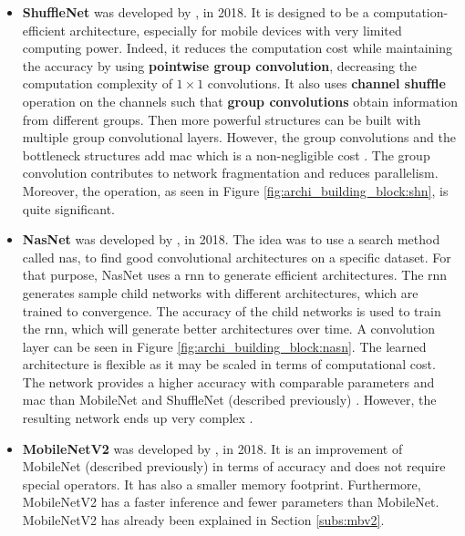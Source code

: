 \begin{itemize}
    \item \textbf{ShuffleNet}  was developed by \textcite{zhang_shufflenet_2018}, in 2018. It is designed to be a computation-efficient architecture, especially for mobile devices with very limited computing power. Indeed, it reduces the computation cost while maintaining the accuracy by using \textbf{pointwise group convolution}, decreasing the computation complexity of $1 \times 1$ convolutions. It also uses \textbf{channel shufﬂe} operation on the channels such that \textbf{group convolutions} obtain information from different groups. Then more powerful structures can be built with multiple group convolutional layers. However, the group convolutions and the bottleneck structures add \acrfull{mac} which is a non-negligible cost \cite{ma_shufflenet_2018}. The group convolution contributes to network fragmentation and reduces parallelism. Moreover, the  operation, as seen in Figure \ref{fig:archi_building_block:shn}, is quite significant.
    \item \textbf{NasNet} was developed by \textcite{zoph_learning_2018}, in 2018. The idea was to use a search method called \acrfull{nas}, to find good convolutional architectures on a specific dataset. For that purpose, NasNet uses a \acrfull{rnn} to generate efficient architectures. The \acrshort{rnn} generates sample child networks with different architectures, which are trained to convergence. The accuracy of the child networks is used to train the \acrshort{rnn}, which will generate better architectures over time. A convolution layer can be seen in Figure \ref{fig:archi_building_block:nasn}. The learned architecture is flexible as it may be scaled in terms of computational cost. The network provides a higher accuracy with comparable parameters and \acrshort{mac} than MobileNet and ShuffleNet (described previously) \cite{zoph_learning_2018}. However, the resulting network ends up very complex \cite{sandler_mobilenetv2_2018}.
    \item \textbf{MobileNetV2} was developed by \textcite{sandler_mobilenetv2_2018}, in 2018. It is an improvement of MobileNet (described previously) in terms of accuracy and does not require special operators. It has also a smaller memory footprint. Furthermore, MobileNetV2 has a faster inference and fewer parameters than MobileNet. MobileNetV2 has already been explained in Section \ref{subs:mbv2}.
\end{itemize}
%
